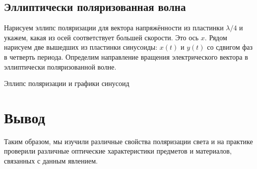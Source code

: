 \subsection{Эллиптически поляризованная волна}

Нарисуем эллипс поляризации для вектора напряжённости из пластинки $ \lambda/4 $ и укажем, какая из осей соответствует большей скорости. Это ось $ x $. Рядом нарисуем две вышедших из пластинки синусоиды: $ x(t) $ и $ y(t) $ со сдвигом фаз в четверть периода. Определим направление вращения электрического вектора в эллиптически поляризованной волне.

\begin{minipage}{0.47\textwidth}
\begin{center}
\end{center}
\end{minipage}
\begin{minipage}{0.47\textwidth}
\begin{center}
\end{center}
\end{minipage}

\begin{center}
Эллипс поляризации и графики синусоид
\end{center}

\section{Вывод}

Таким образом, мы изучили различные свойства поляризации света и на практике проверили различные оптические характеристики предметов и материалов, связанных с данным явлением. 







